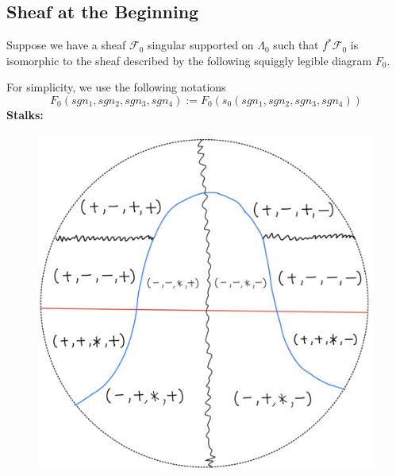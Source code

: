 \subsection*{Sheaf at the Beginning}
Suppose we have a sheaf $\mathscr{F}_0$ singular supported on $\Lambda_0$ such that $f^*\mathscr{F}_0$ is isomorphic to the sheaf described by the following squiggly legible diagram $F_0$.

For simplicity, we use the following notations
\[
F_0(sgn_1,sgn_2,sgn_3,sgn_4):=F_0(s_0(sgn_1,sgn_2,sgn_3,sgn_4))
\]
\textbf{Stalks:}
\begin{figure}[H]
    \centering
    \includegraphics[scale = 0.45]{diagrams/cobord'2/27.png} 
    \caption{}
    \label{fig:your-label}
\end{figure}
